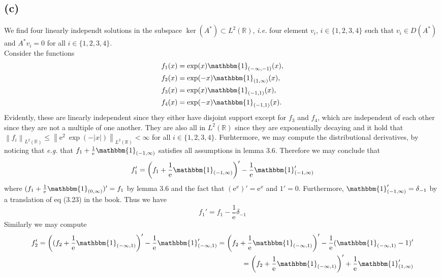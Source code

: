 \documentclass[a4paper,11pt]{article}
\newcommand{\euler}[1]{\text{e}^{#1}}
\newcommand{\norm}[1]{\left\lVert #1 \right\rVert}
\newcommand{\abs}[1]{\left\lvert #1 \right\rvert}
\newcommand{\ie}{\emph{i.e.} }
\newcommand{\eg}{\emph{e.g.} }
\newcommand{\R}{\mathbb{R}}
\numberwithin{equation}{section}
\begin{document}
\subsection*{(c)}
We find four linearly independt solutions in the subspace $ \ker(A^*)\subset L^2(\R) $, \ie four element $ v_i $, $ i\in\{1,2,3,4\} $ such that $ v_i\in D(A^*) $ and $ A^*v_i=0 $ for all $ i\in\{1,2,3,4\} $.\\
Consider the functions \begin{equation}
\begin{aligned}
f_1(x)&=\exp(x)\mathbbm{1}_{(-\infty,-1)}(x),\\
f_2(x)&=\exp(-x)\mathbbm{1}_{(1,\infty)}(x),\\
f_3(x)&=\exp(x)\mathbbm{1}_{(-1,1)}(x),\\
f_4(x)&=\exp(-x)\mathbbm{1}_{(-1,1)}(x).
\end{aligned}
\end{equation}
Evidently, these are linearly independent since they either have disjoint support except for $ f_3 $ and $ f_4 $, which are independent of each other since they are not a multiple of one another. They are also all in $ L^2(\R) $ since they are exponentially decaying and it hold that $ \norm{f_i}_{L^2(\R)}\leq\norm{\euler{2}\ \exp(-\abs{x})}_{L^2(\R)}<\infty $ for all $ i\in\{1,2,3,4\} $. Furhtermore, we may compute the distributional derivatives, by noticing that \eg that $ f_1+\frac{1}{\euler{}}\mathbbm{1}_{(-1,\infty)} $ satisfies all assumptions in lemma 3.6. Therefore we may conclude that \begin{equation}
f_1'=\left(f_1+\frac{1}{\euler{}}\mathbbm{1}_{(-1,\infty)}\right)'-\frac{1}{\euler{}}\mathbbm{1}_{(-1,\infty)}'
\end{equation}
where $ (f_1+\frac{1}{\euler{}}\mathbbm{1}_{(0,\infty)})'=f_1 $ by lemma 3.6 and the fact that $ (\euler{x})'=\euler{x} $ and $ 1'=0 $. Furthermore, $ \mathbbm{1}_{(-1,\infty)}'=\delta_{-1} $ by a translation of eq (3.23) in the book. Thus we have\begin{equation}
f_1'=f_1-\frac{1}{\euler{}}\delta_{-1}
\end{equation}
Similarly we may compute \begin{equation}
\begin{aligned}
f_2'=\left((f_2+\frac{1}{\euler{}}\mathbbm{1}_{(-\infty,1)}\right)'-\frac{1}{\euler{}}\mathbbm{1}_{(-\infty,1)}'=\left(f_2+\frac{1}{\euler{}}\mathbbm{1}_{(-\infty,1)}\right)'-\frac{1}{\euler{}}(\mathbbm{1}_{(-\infty,1)}-1)'\\=\left(f_2+\frac{1}{\euler{}}\mathbbm{1}_{(-\infty,1)}\right)'+\frac{1}{\euler{}}\mathbbm{1}_{(1,\infty)}'
\end{aligned}
\end{equation}
\end{document}
